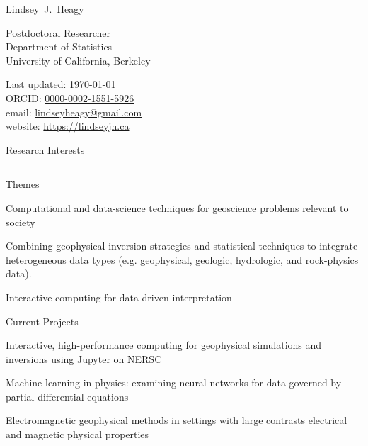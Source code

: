 \documentclass[a4paper, 11pt]{article}
\makeatletter
\newcommand{\firstname}{Lindsey}
\newcommand{\middleinitial}{J.}
\newcommand{\lastname}{Heagy}
\newcommand{\emailaddress}{lindseyheagy@gmail.com}
\newcommand{\email}{\href{mailto:\emailaddress}{\emailaddress}}
\newcommand{\websiteurl}{https://lindseyjh.ca}
\newcommand{\website}{\href{\websiteurl}{\websiteurl}}
\newcommand{\ORCIDNumber}{0000-0002-1551-5926}
\newcommand{\ORCID}{\href{https://orcid.org/\ORCIDNumber}{\ORCIDNumber}}
\newcommand{\position}{Postdoctoral Researcher}
\newcommand{\affiliation}{
    Department of Statistics \\
    University of California, Berkeley
}
\newcommand{\fullname}{\firstname\ \middleinitial\  \lastname}
\newcommand{\mytitle}[1]{
    {%
    \Huge #1
    }\\[0.35cm]
}
\newcommand{\heading}[1]{
\begin{samepage}
    \vspace{0.5cm}
    {%
    \LARGE
    #1}\\
    \vspace{-0.2cm}
    \hrule
    \vspace{0.2cm}
\end{samepage}
}
\newcommand{\subheading}[1]{
    \vspace{0.3cm}
    {%
    \Large
    #1}\\
    \vspace{0.0cm}
}
\makeatother
\begin{document}
\thispagestyle{empty}


\mytitle{\fullname}
\begin{minipage}[t]{0.595\textwidth}
    \position \\
    \affiliation
\end{minipage}
\begin{minipage}[t]{0.4\textwidth}
    \begin{flushright}
        Last updated: \monthyear\today
        \\
        ORCID: \ORCID
        \\
        email: \email
        \\
        website: \website
    \end{flushright}
\end{minipage}


\heading{Research Interests}
\subheading{Themes}
\begin{myitemize}
    \item{Computational and data-science techniques for geoscience problems relevant to society}
    \item{Combining geophysical inversion strategies and statistical techniques to integrate heterogeneous data types (e.g. geophysical, geologic, hydrologic, and rock-physics data).}
    \item{Interactive computing for data-driven interpretation}
\end{myitemize}\vspace{0.2cm}
\subheading{Current Projects}
\begin{myitemize}
    \item{Interactive, high-performance computing for geophysical simulations and inversions using Jupyter on NERSC}
    \item{Machine learning in physics: examining neural networks for data governed by partial differential equations}
    \item{Electromagnetic geophysical methods in settings with large contrasts electrical and magnetic physical properties}
\end{myitemize}
\end{document}
